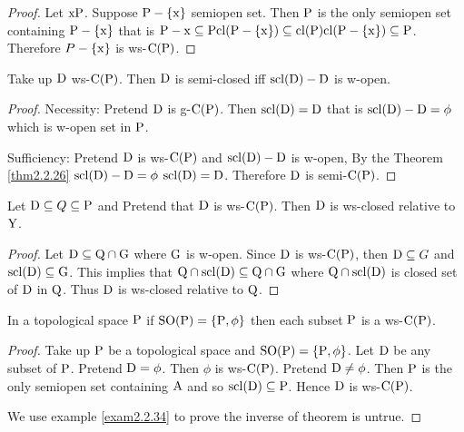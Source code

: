 \begin{proof}
Let $\mathrm{x}\mathrm{P}$. Suppose $\mathrm{P}-\{\mathrm{x}\}$ semiopen set. Then $\mathrm{P}$ is the only semiopen set containing $\mathrm{P}-\{\mathrm{x}\}$ that is $\mathrm{P}-{\mathrm{x}} \subseteq \mathrm{P} \mathrm{cl}(\mathrm{P}-\{\mathrm{x}\}) \subseteq \mathrm{cl}(\mathrm{P}) \mathrm{cl}(\mathrm{P}-\{\mathrm{x}\})\subseteq \mathrm{P}$. Therefore $P-\{\mathrm{x}\}$ is ws-$\mathrm{C}(\mathrm{P})$.
\end{proof}

\begin{thm}\label{thm2.2.31}
Take up $\mathrm{D}$ ws-$\mathrm{C}(\mathrm{P})$. Then $\mathrm{D}$ is semi-closed iff $\mathrm{scl}(\mathrm{D})-\mathrm{D}$ is w-open.
\end{thm}

\begin{proof}
Necessity: Pretend $\mathrm{D}$ is g-$\mathrm{C}(\mathrm{P})$. Then $\mathrm{scl}(\mathrm{D})=\mathrm{D}$ that is $\mathrm{scl}(\mathrm{D})-\mathrm{D}=\phi$ which is w-open set in $\mathrm{P}$.

Sufficiency: Pretend $\mathrm{D}$ is ws-$\mathrm{C}(\mathrm{P})$ and $\mathrm{scl}(\mathrm{D})-\mathrm{D}$ is w-open, By the Theorem \ref{thm2.2.26} $\mathrm{scl}(\mathrm{D})-\mathrm{D}=\phi$ $\mathrm{scl}(\mathrm{D})=\mathrm{D}$. Therefore $\mathrm{D}$ is semi-$\mathrm{C}(\mathrm{P})$.
\end{proof}

\begin{thm}\label{thm2.2.32}
Let $\mathrm{D}\subseteq Q\subseteq \mathrm{P}$ and Pretend that $\mathrm{D}$ is ws-$\mathrm{C}(\mathrm{P})$. Then $\mathrm{D}$ is ws-closed relative to $\mathrm{Y}$.
\end{thm}

\begin{proof}
Let $\mathrm{D}\subseteq \mathrm{Q}\cap \mathrm{G}$ where $\mathrm{G}$ is w-open. Since $\mathrm{D}$ is ws-$\mathrm{C}(\mathrm{P})$, then $\mathrm{D}\subseteq G$ and $\mathrm{scl}(\mathrm{D})\subseteq \mathrm{G}$. This
implies that $\mathrm{Q} \cap \mathrm{scl}(\mathrm{D}) \subseteq \mathrm{Q}\cap \mathrm{G}$ where $\mathrm{Q} \cap \mathrm{scl}(\mathrm{D})$ is closed set of $\mathrm{D}$ in $\mathrm{Q}$. Thus $\mathrm{D}$ is ws-closed
relative to $\mathrm{Q}$.
\end{proof}

\begin{thm}\label{thm2.2.33}
In a topological space $\mathrm{P}$ if $\mathrm{SO}(\mathrm{P}) =\{\mathrm{P}, \phi\}$ then each subset $\mathrm{P}$ is a ws-$\mathrm{C}(\mathrm{P})$.
\end{thm}

\begin{proof}
Take up $\mathrm{P}$ be a topological space and $\mathrm{SO}(\mathrm{P})=\{\mathrm{P}, \phi\}$. Let $\mathrm{D}$ be any subset of $\mathrm{P}$. Pretend $\mathrm{D}=\phi$. Then $\phi$ is ws-$\mathrm{C}(\mathrm{P})$. Pretend $\mathrm{D}\neq\phi$. Then $\mathrm{P}$  is the only semiopen set containing $\mathrm{A}$ and so $\mathrm{scl}(\mathrm{D})\subseteq \mathrm{P}$. Hence $\mathrm{D}$ is ws-$\mathrm{C}(\mathrm{P})$. 

We use example \ref{exam2.2.34} to prove the inverse of theorem is untrue.
\end{proof}

